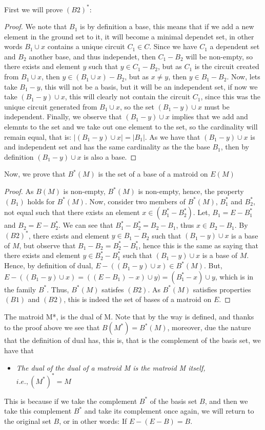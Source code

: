 First we will prove $(B2)^*$:
\begin{proof}
  We note that $B_1$ is by definition a base, this means that if we add a new element in the ground set to it, it will become a minimal dependet set, in other words $B_1 \cup x$ contains a unique circuit $C_1 \in C$. Since we have $C_1$ a dependent set and $B_2$ another base, and thus independet, then $C_1 - B_2$ will be non-empty, so there exists and element $y$ such that $y \in C_1 - B_2$, but as $C_1$ is the circuit created from $B_1 \cup x$, then $y \in (B_1 \cup x) - B_2$, but as $x \neq y$, then $y \in B_1 - B_2$. Now, lets take $B_1 - y$, this will not be a basis, but it will be an independent set, if now we take $(B_1 - y)\cup x$, this will clearly not contain the circuit $C_1$, since this was the unique circuit generated from $B_1 \cup x$, so the set $(B_1 - y)\cup x$ must be independent. Finally, we observe that $(B_1 - y)\cup x$ implies that we add and elemnts to the set and we take out one element to the set, so the cardinality will remain equal, that is: $|(B_1 - y)\cup x|=|B_1|$.
As we have that $(B_1 - y)\cup x$ is and independent set and has the same cardinality as the the base $B_1$, then by definition $(B_1 - y)\cup x$ is also a base.  
\end{proof}

Now, we prove that $B^*(M)$ is the set of a base of a matroid on $E(M)$
\begin{proof}
    As $B(M)$ is non-empty, $B^*(M)$ is non-empty, hence, the property $(B_1)$ holds for $B^*(M)$. 
    Now, consider two members of $B^*(M)$, $B^*_1$ and $B^*_2$, not equal such that there exists an element $x \in (B^*_1 - B^*_2)$. Let, $B_1 = E - B^*_1$ and $B_2 = E - B^*_2$. We can see that $B^*_1 - B^*_2 = B_2 - B_1$, thus $x \in B_2 - B_1$. By $(B2)^*$, there exists and element $y \in  B_1 - B_2$ such that $(B_1 - y)\cup x$ is a base of $M$, but observe that $B_1 - B_2 = B^*_2 - B^*_1$, hence this is the same as saying that there exists and element $y \in  B^*_2 - B^*_1$ such that $(B_1 - y)\cup x$ is a base of $M$. Hence, by definition of dual, $E-((B_1 - y)\cup x) \in B^*(M)$. But, $E-((B_1 - y)\cup x) = ((E-B_1)-x)\cup y) = (B_1^* - x)\cup y$, which is in the family $B^*$. Thus, $B^*(M)$ satisfes $(B2)$. As $B^*(M)$ satisfies properties $(B1)$ and $(B2)$, this is indeed the set of bases of a matroid on $E$.
\end{proof}

The matroid M*, is the dual of M. Note that by the way is defined, and thanks to the proof above we see that $B(M^*)=B^*(M)$, moreover, due the nature that the definition of dual has, this is, that is the complement of the basis set, we have that
\begin{itemize}
    \item \textit{The dual of the dual of a matroid M is the matroid M itself, $i.e., (M^*)^* = M$}
\end{itemize}
This is because if we take the complement $B^*$ of the basis set $B$, and then we take this complement $B^*$ and take its complement once again, we will return to the original set $B$, or in other words: If $E-(E - B) = B$.\\


